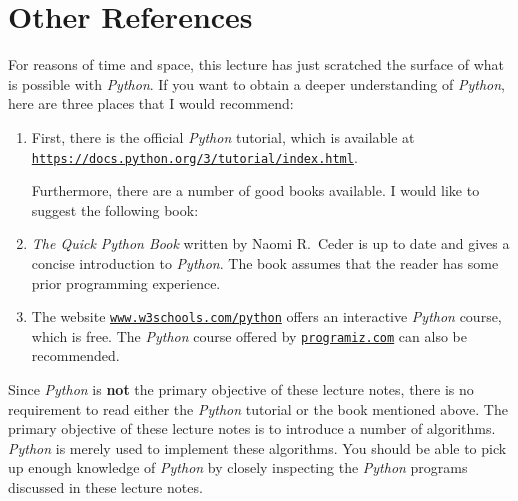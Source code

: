\section{Other References}
For reasons of time and space, this lecture has just scratched the surface of what is possible with
\textsl{Python}.  If you want to obtain a deeper understanding of \textsl{Python}, here are three places that 
I would recommend:
\begin{enumerate}
\item First, there is the official \textsl{Python} tutorial, which is available at
      \\[0.2cm]
      \hspace*{1.3cm}
      \href{https://docs.python.org/3/tutorial/index.html}{\texttt{https://docs.python.org/3/tutorial/index.html}}.

      Furthermore, there are a number of good books available.  I would like to suggest the following 
      book:
\item \emph{The Quick Python Book} written by Naomi R.~Ceder \cite{ceder:2018} is up to date and gives a
      concise introduction to \textsl{Python}.  The book assumes that the reader has some prior programming
      experience.
\item The website
      \href{https://www.w3schools.com/python/default.asp}{\texttt{www.w3schools.com/python}}
      offers an interactive \textsl{Python} course, which is free.
      The \textsl{Python} course offered by \href{https://programiz.com}{\texttt{programiz.com}}
      can also be recommended.  
\end{enumerate}
Since \textsl{Python} is \textbf{not} the primary objective of these lecture notes, there is no requirement to read
either the \textsl{Python} tutorial or the book mentioned above.  The primary objective of these
lecture notes is to introduce a number of algorithms.
\textsl{Python} is merely used to implement these algorithms.  You should
be able to pick up enough knowledge of \textsl{Python} by closely inspecting the \textsl{Python} programs
discussed in these lecture notes.  


